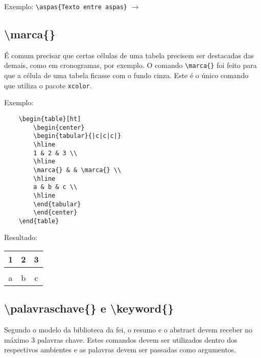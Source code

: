 \documentclass{fei}
\begin{document}
    Exemplo: \verb+\aspas{Texto entre aspas}+ $\to$ 
    
    \subsection{\textbackslash marca\{\}}
    É comum precisar que certas células de uma tabela precisem ser destacadas das demais, como em cronogramas, por exemplo. O comando \verb+\marca{}+ foi feito para que a célula de uma tabela ficasse com o fundo cinza. Este é o único comando que utiliza o pacote \texttt{xcolor}.

    Exemplo:
    \begin{verbatim}
    \begin{table}[ht]
        \begin{center}
        \begin{tabular}{|c|c|c|}
        \hline
        1 & 2 & 3 \\
        \hline
        \marca{} & & \marca{} \\
        \hline
        a & b & c \\
        \hline
        \end{tabular}
        \end{center}
    \end{table}
    \end{verbatim}
    Resultado: 
    \begin{table}[ht]
        \begin{center}
        \begin{tabular}{|c|c|c|}
        \hline
        1 & 2 & 3 \\
        \hline
        \marca{} & & \marca{} \\
        \hline
        a & b & c \\
        \hline
        \end{tabular}
        \end{center}
    \end{table}
        
    \subsection{\textbackslash palavraschave\{\} e \textbackslash keyword\{\}}
    Segundo o modelo da biblioteca da \gls{fei}, o resumo e o abstract devem receber no máximo 3 palavras chave. Estes comandos devem ser utilizados dentro dos respectivos ambientes e as palavras devem ser passadas como argumentos.
\end{document}
